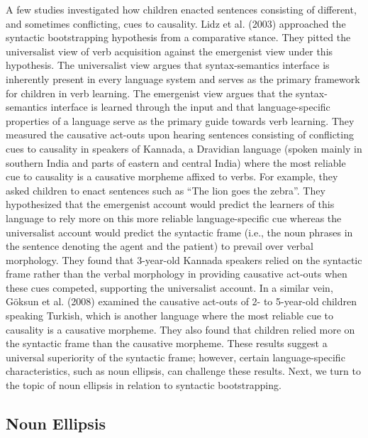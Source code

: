 \documentclass[man]{apa6}
\begin{document}
A few studies investigated how children enacted sentences consisting of
different, and sometimes conflicting, cues to causality. Lidz et al.
(2003) approached the syntactic bootstrapping hypothesis from a
comparative stance. They pitted the universalist view of verb
acquisition against the emergenist view under this hypothesis. The
universalist view argues that syntax-semantics interface is inherently
present in every language system and serves as the primary framework for
children in verb learning. The emergenist view argues that the
syntax-semantics interface is learned through the input and that
language-specific properties of a language serve as the primary guide
towards verb learning. They measured the causative act-outs upon hearing
sentences consisting of conflicting cues to causality in speakers of
Kannada, a Dravidian language (spoken mainly in southern India and parts
of eastern and central India) where the most reliable cue to causality
is a causative morpheme affixed to verbs. For example, they asked
children to enact sentences such as \enquote{The lion goes the zebra}.
They hypothesized that the emergenist account would predict the learners
of this language to rely more on this more reliable language-specific
cue whereas the universalist account would predict the syntactic frame
(i.e., the noun phrases in the sentence denoting the agent and the
patient) to prevail over verbal morphology. They found that 3-year-old
Kannada speakers relied on the syntactic frame rather than the verbal
morphology in providing causative act-outs when these cues competed,
supporting the universalist account. In a similar vein, Göksun et al.
(2008) examined the causative act-outs of 2- to 5-year-old children
speaking Turkish, which is another language where the most reliable cue
to causality is a causative morpheme. They also found that children
relied more on the syntactic frame than the causative morpheme. These
results suggest a universal superiority of the syntactic frame; however,
certain language-specific characteristics, such as noun ellipsis, can
challenge these results. Next, we turn to the topic of noun ellipsis in
relation to syntactic bootstrapping.

\subsection{Noun Ellipsis}\label{noun-ellipsis}
\end{document}
